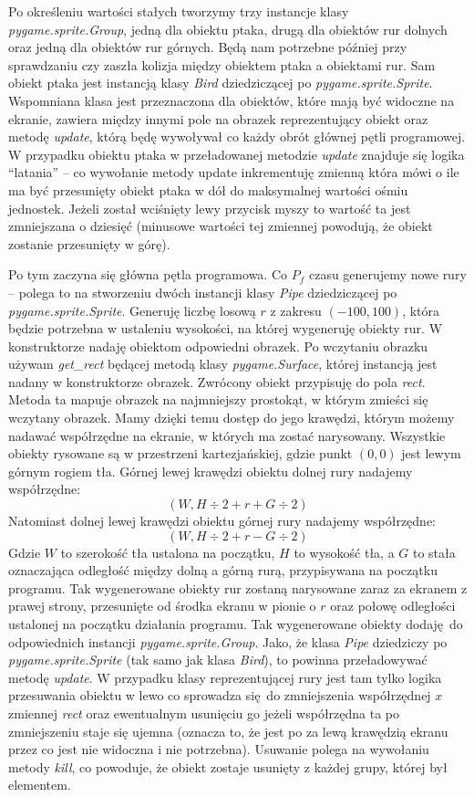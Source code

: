 \documentclass[a4paper, 12pt,oneside]{book}
\begin{document}
Po określeniu wartości stałych tworzymy trzy instancje klasy
\textit{pygame.sprite.Group}, jedną dla obiektu ptaka, drugą dla obiektów rur
dolnych oraz jedną dla obiektów rur górnych. Będą nam potrzebne później przy
sprawdzaniu czy zaszła kolizja między obiektem ptaka a obiektami rur.
Sam obiekt ptaka jest instancją klasy \textit{Bird} dziedziczącej po
\textit{pygame.sprite.Sprite}. Wspomniana klasa jest przeznaczona dla obiektów,
które mają być widoczne na ekranie, zawiera między innymi
pole na obrazek reprezentujący obiekt oraz metodę
\textit{update}\cite{pygame_sprite_documentation}, którą będę wywoływał co
każdy obrót głównej pętli programowej. W przypadku obiektu ptaka w
przeładowanej metodzie \textit{update} znajduje się logika ``latania'' --
co wywołanie metody update inkrementuję zmienną która mówi o ile ma
być przesunięty obiekt ptaka w dół do maksymalnej wartości ośmiu jednostek.
Jeżeli został wciśnięty lewy przycisk myszy to wartość ta jest zmniejszana o
dziesięć (minusowe wartości tej zmiennej powodują, że obiekt zostanie
przesunięty w górę).

Po tym zaczyna się główna pętla programowa. Co $P_f$ czasu generujemy nowe rury
-- polega to na stworzeniu dwóch instancji klasy \textit{Pipe} dziedziczącej
po \textit{pygame.sprite.Sprite}. Generuję liczbę losową $r$ z zakresu
$(-100, 100)$, która będzie potrzebna w ustaleniu wysokości, na której 
wygeneruję obiekty rur. W konstruktorze nadaję obiektom odpowiedni
obrazek. Po wczytaniu obrazku używam \textit{get\_rect}
będącej metodą klasy \textit{pygame.Surface}, której instancją jest nadany w
konstruktorze obrazek. Zwrócony obiekt przypisuję do pola \textit{rect}.
Metoda ta mapuje obrazek na najmniejszy prostokąt, w którym zmieści się
wczytany obrazek. Mamy dzięki temu dostęp do jego krawędzi, którym możemy
nadawać współrzędne na ekranie, w których ma zostać narysowany.
Wszystkie obiekty rysowane są w przestrzeni kartezjańskiej, gdzie punkt
$(0,0)$ jest lewym górnym rogiem tła.
Górnej lewej krawędzi obiektu dolnej rury nadajemy współrzędne:
\[(W, H \div 2 + r + G \div 2)\]
Natomiast dolnej lewej krawędzi obiektu górnej rury nadajemy współrzędne:
\[(W, H \div 2 + r - G \div 2)\]
Gdzie $W$ to szerokość tła ustalona na początku, $H$ to wysokość tła, a
$G$ to stała oznaczająca odległość między dolną a górną rurą, przypisywana
na początku programu. 
Tak wygenerowane obiekty rur zostaną narysowane zaraz za ekranem z prawej
strony, przesunięte od środka ekranu w pionie o $r$ oraz połowę odległości
ustalonej na początku
działania programu. Tak wygenerowane obiekty dodaję do odpowiednich instancji
\textit{pygame.sprite.Group}. Jako, że klasa \textit{Pipe} dziedziczy po
\textit{pygame.sprite.Sprite} (tak samo jak klasa \textit{Bird}), to powinna
przeładowywać metodę \textit{update}\cite{pygame_sprite_documentation}.
W przypadku klasy reprezentującej rury jest tam tylko logika przesuwania
obiektu w lewo co sprowadza się do zmniejszenia współrzędnej $x$ 
zmiennej \textit{rect} oraz ewentualnym usunięciu go jeżeli współrzędna ta
po zmniejszeniu staje się ujemna (oznacza to, że jest po za lewą krawędzią
ekranu przez co jest nie widoczna i nie potrzebna). Usuwanie polega na
wywołaniu metody \textit{kill}, co powoduje, że obiekt zostaje usunięty
z każdej grupy, której był elementem.
\end{document}
